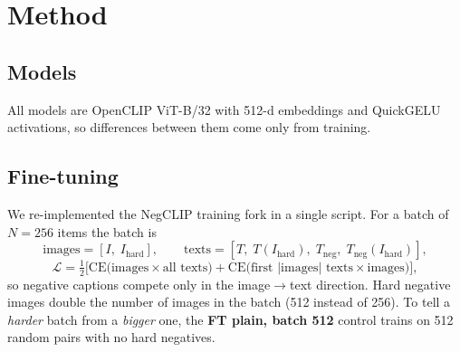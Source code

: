 \documentclass[11pt,a4paper]{article}
\begin{document}
\section{Method}

\subsection{Models}
All models are OpenCLIP \cite{openclip} ViT-B/32 with 512-d embeddings and QuickGELU activations, so
differences between them come only from training.

\begin{table}[H]
\centering\small
\caption{Models. ``FT'' models are our own fine-tunes of OpenAI CLIP on the NegCLIP train split.}
\label{tab:models}
\end{table}

\subsection{Fine-tuning}
We re-implemented the NegCLIP training fork in a single script. For a batch of $N=256$ items the batch is
\begin{equation}
\text{images}=[I,\;I_{\text{hard}}],\qquad
\text{texts}=[T,\;T(I_{\text{hard}}),\;T_{\text{neg}},\;T_{\text{neg}}(I_{\text{hard}})],
\end{equation}
\begin{equation}
\mathcal{L}=\tfrac12\Big[\mathrm{CE}\big(\text{images}\times\text{all texts}\big)+
\mathrm{CE}\big(\text{first }|\text{images}|\text{ texts}\times\text{images}\big)\Big],
\end{equation}
so negative captions compete only in the image$\to$text direction. Hard negative images double the number
of images in the batch (512 instead of 256). To tell a \emph{harder} batch from a \emph{bigger} one, the
\textbf{FT plain, batch 512} control trains on 512 random pairs with no hard negatives.
\end{document}
